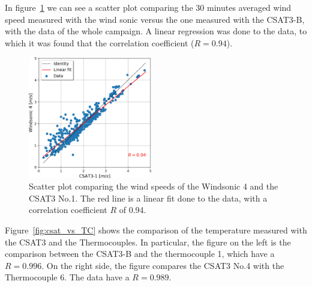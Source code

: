 In figure~\ref{fig:csat1_vs_ws3} we can see a scatter plot comparing the 30 minutes averaged wind speed measured with the wind sonic versus the one measured with the CSAT3-B, with the data of the whole campaign. A linear regression was done to the data, to which it was found that the correlation coefficient ($R = 0.94$).  

\begin{figure}[!ht]
    \centering
    \includegraphics[width=0.48\textwidth]{fig/chapter_4/gunshot_csat1_vs_ws3.png}
    \caption{Scatter plot comparing the wind speeds of the Windsonic 4 and the CSAT3 No.1. The red line is a linear fit done to the data, with a correlation coefficient $R$ of 0.94.}
    \label{fig:csat1_vs_ws3}
\end{figure}

Figure~\ref{fig:csat_vs_TC} shows the comparison of the temperature measured with the CSAT3 and the Thermocouples. In particular, the figure on the left is the comparison between the CSAT3-B and the thermocouple 1, which have a $R = 0.996$. On the right side, the figure compares the CSAT3 No.4 with the Thermocouple 6. The data have a $R = 0.989$. 

